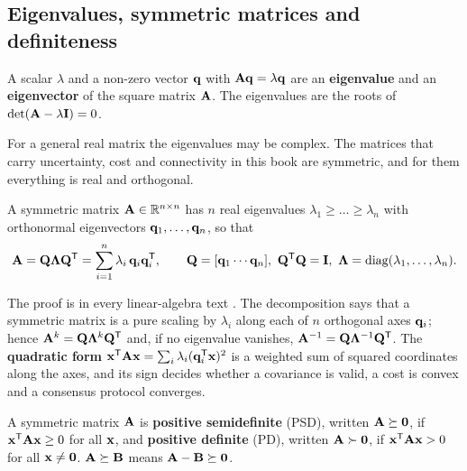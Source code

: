 \subsection{Eigenvalues, symmetric matrices and definiteness}
\label{sec:appB-psd}

\begin{definition}
\label{def:appB-eigen}
A scalar $\lambda$ and a non-zero vector $\mathbf{q}$ with $\mathbf{A}\mathbf{q} =
\lambda\mathbf{q}$ are an \textbf{eigenvalue} and an
\textbf{eigenvector} of the square matrix $\mathbf{A}$. The eigenvalues are the
roots of $\det(\mathbf{A} - \lambda\mathbf{I}) = 0$.
\end{definition}

For a general real matrix the eigenvalues may be complex. The matrices that
carry uncertainty, cost and connectivity in this book are symmetric, and for
them everything is real and orthogonal.

\begin{theorem}
\label{thm:appB-spectral}
A symmetric matrix $\mathbf{A} \in \mathbb{R}^{n \times n}$ has $n$ real eigenvalues
$\lambda_1 \ge \dots \ge \lambda_n$ with orthonormal eigenvectors
$\mathbf{q}_1, \dots, \mathbf{q}_n$, so that
\begin{equation}
  \mathbf{A} = \mathbf{Q}\mathbf{\Lambda}\mathbf{Q}^{\mathsf{T}} = \sum_{i=1}^{n} \lambda_i\, \mathbf{q}_i \mathbf{q}_i^{\mathsf{T}},
  \qquad \mathbf{Q} = [\mathbf{q}_1 \cdots \mathbf{q}_n],\ \mathbf{Q}^{\mathsf{T}}\mathbf{Q} = \mathbf{I},\
  \mathbf{\Lambda} = \operatorname{diag}(\lambda_1, \dots, \lambda_n).
  \label{eq:appB-spectral}
\end{equation}
\end{theorem}

The proof is in every linear-algebra text \cite[Appendix~A]{boyd2004convex}.
The decomposition says that a symmetric matrix is a pure scaling by
$\lambda_i$ along each of $n$ orthogonal axes $\mathbf{q}_i$; hence $\mathbf{A}^k =
\mathbf{Q}\mathbf{\Lambda}^k\mathbf{Q}^{\mathsf{T}}$ and, if no eigenvalue vanishes, $\mathbf{A}^{-1} =
\mathbf{Q}\mathbf{\Lambda}^{-1}\mathbf{Q}^{\mathsf{T}}$. The \textbf{quadratic form}
$\mathbf{x}^{\mathsf{T}}\mathbf{A}\mathbf{x} = \sum_i \lambda_i (\mathbf{q}_i^{\mathsf{T}}\mathbf{x})^2$ is a
weighted sum of squared coordinates along the axes, and its sign decides
whether a covariance is valid, a cost is convex and a consensus protocol
converges.

\begin{definition}
\label{def:appB-psd}
A symmetric matrix $\mathbf{A}$ is \textbf{positive semidefinite}
(PSD), written $\mathbf{A} \succeq \mathbf{0}$, if $\mathbf{x}^{\mathsf{T}}\mathbf{A}\mathbf{x} \ge 0$
for all $\mathbf{x}$, and \textbf{positive definite}
(PD), written $\mathbf{A} \succ \mathbf{0}$, if $\mathbf{x}^{\mathsf{T}}\mathbf{A}\mathbf{x} > 0$ for
all $\mathbf{x} \ne \mathbf{0}$. $\mathbf{A} \succeq \mathbf{B}$ means $\mathbf{A} - \mathbf{B}
\succeq \mathbf{0}$.
\end{definition}

